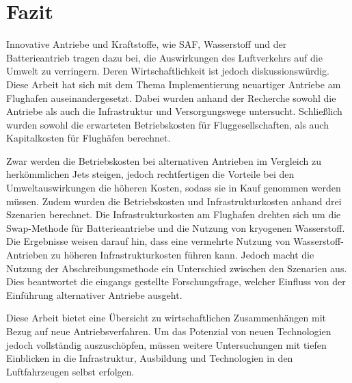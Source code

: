 \chapter{Fazit}
\label{ch:Fazit}
Innovative Antriebe und Kraftstoffe, wie SAF, Wasserstoff und der Batterieantrieb tragen dazu bei, die Auswirkungen des Luftverkehrs auf die Umwelt zu verringern.
Deren Wirtschaftlichkeit ist jedoch diskussionswürdig.
Diese Arbeit hat sich mit dem Thema Implementierung neuartiger Antriebe am Flughafen auseinandergesetzt. 
Dabei wurden anhand der Recherche sowohl die Antriebe als auch die Infrastruktur und Versorgungswege untersucht.
Schließlich wurden sowohl die erwarteten Betriebskosten für Fluggesellschaften, als auch Kapitalkosten für Flughäfen berechnet.

Zwar werden die Betriebskosten bei alternativen Antrieben im Vergleich zu herkömmlichen Jets steigen, 
jedoch rechtfertigen die Vorteile bei den Umweltauswirkungen die höheren Kosten, sodass sie in Kauf genommen werden müssen.
Zudem wurden die Betriebskosten und Infrastrukturkosten anhand drei Szenarien berechnet. 
Die Infrastrukturkosten am Flughafen drehten sich um die Swap-Methode für Batterieantriebe 
und die Nutzung von kryogenen Wasserstoff.
Die Ergebnisse weisen darauf hin, dass eine vermehrte Nutzung von Wasserstoff-Antrieben zu 
höheren Infrastrukturkosten führen kann.
Jedoch macht die Nutzung der Abschreibungsmethode ein Unterschied zwischen den Szenarien aus. 
Dies beantwortet die eingangs gestellte Forschungsfrage, welcher Einfluss von der Einführung alternativer Antriebe ausgeht.

Diese Arbeit bietet eine Übersicht zu wirtschaftlichen Zusammenhängen mit Bezug auf neue Antriebsverfahren.
Um das Potenzial von neuen Technologien jedoch vollständig auszuschöpfen, müssen weitere Untersuchungen 
mit tiefen Einblicken in die Infrastruktur, Ausbildung und Technologien in den Luftfahrzeugen selbst erfolgen.
